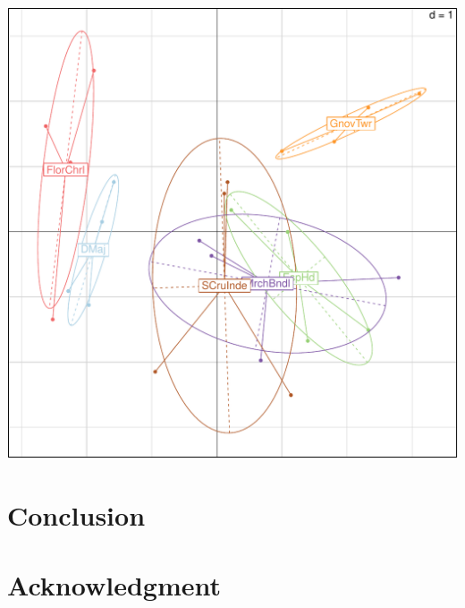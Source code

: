 \documentclass[12pt]{article}\usepackage[]{graphicx}\usepackage[]{color}
\makeatletter
\def\maxwidth{ %
  \ifdim\Gin@nat@width>\linewidth
    \linewidth
  \else
    \Gin@nat@width
  \fi
}
\newenvironment{knitrout}{}{} %
\makeatother
\begin{document}
\begin{knitrout}
\includegraphics[width=\maxwidth]{figure/unnamed-chunk-605} 

\end{knitrout}

\section{Conclusion}
\section{Acknowledgment}
\end{document}
